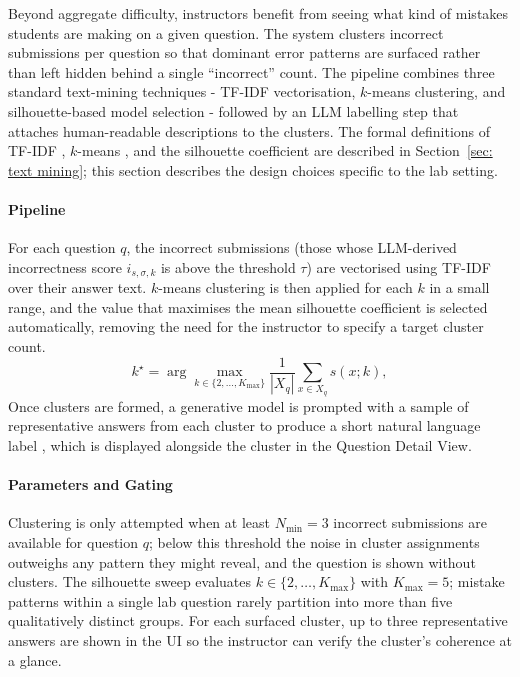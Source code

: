 Beyond aggregate difficulty, instructors benefit from seeing what kind of mistakes students are making on a given question. 
The system clusters incorrect submissions per question so that dominant error patterns are surfaced rather than left hidden behind a single “incorrect” count. 
The pipeline combines three standard text-mining techniques - TF-IDF vectorisation, $k$-means clustering, and silhouette-based model selection - followed by an LLM labelling step that attaches human-readable descriptions to the clusters. The formal definitions of TF-IDF \cite{saltonVectorSpaceModel1975,manningIntroductionInformationRetrieval2006}, $k$-means \cite{MacQueen1967SomeMF,arthurKmeansAdvantagesCareful}, and the silhouette coefficient \cite{rousseeuwSilhouettesGraphicalAid1987} are described in Section~\ref{sec: text mining}; this section describes the design choices specific to the lab setting.

\paragraph{Pipeline} 
For each question $q$, the incorrect submissions (those whose LLM-derived incorrectness score $i_{s,\sigma,k}$ is above the threshold $\tau$) are vectorised using TF-IDF over their answer text. 
$k$-means clustering is then applied for each $k$ in a small range, and the value that maximises the mean silhouette coefficient is selected automatically, removing the need for the instructor to specify a target cluster count.  
\begin{equation}
    k^\star = \arg\max_{k \in \{2,\ldots,K_{\max}\}} \frac{1}{|X_q|} \sum_{x \in X_q} s(x; k),
    \label{eq:cluster-auto-k}
\end{equation}
Once clusters are formed, a generative model is prompted with a sample of representative answers from each cluster to produce a short natural language label \cite{wangGoalDrivenExplainableClustering2023}, which is displayed alongside the cluster in the Question Detail View. 

\paragraph{Parameters and Gating}
Clustering is only attempted when at least $N_{\min} = 3$ incorrect submissions are available for question $q$; below this threshold the noise in cluster assignments outweighs any pattern they might reveal, and the question is shown without clusters. 
The silhouette sweep evaluates $k \in \{2, \ldots, K_{\max}\}$ with $K_{\max} = 5$; mistake patterns within a single lab question rarely partition into more than five qualitatively distinct groups. 
For each surfaced cluster, up to three representative answers are shown in the UI so the instructor can verify the cluster's coherence at a glance.


